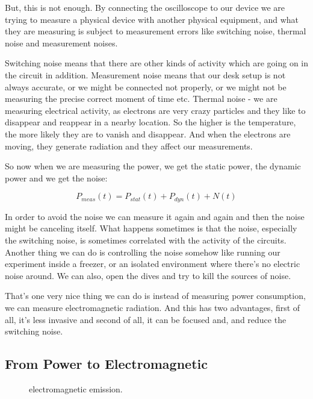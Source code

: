 But, this is not enough. By connecting the oscilloscope to our device we are
trying to measure a physical device with another physical equipment, and what
they are measuring is subject to measurement errors like switching noise,
thermal noise and measurement noises.

Switching noise means that there are other kinds of activity which are going on
in the circuit in addition. Measurement noise means that our desk setup is not
always accurate, or we might be connected not properly, or we might not be
measuring the precise correct moment of time etc. Thermal noise - we are
measuring electrical activity, as electrons are very crazy particles and they
like to disappear and reappear in a nearby location. So the higher is the
temperature, the more likely they are to vanish and disappear. And when the
electrons are moving, they generate radiation and they affect our measurements.

So now when we are measuring the power, we get the static power, the dynamic
power and we get the noise:

\begin{displaymath}
    P_{meas}(t)=P_{stat}(t) + P_{dyn}(t) + N(t)
\end{displaymath}

In order to avoid the noise we can measure it again and again and then the noise
might be canceling itself. What happens sometimes is that the noise, especially
the switching noise, is sometimes correlated with the activity of the circuits.
Another thing we can do is controlling the noise somehow like running our
experiment inside a freezer, or an isolated environment where there's no
electric noise around. We can also, open the dives and try to kill the sources
of noise.

That's one very nice thing we can do is instead of measuring power consumption,
we can measure electromagnetic radiation. And this has two advantages, first of
all, it's less invasive and second of all, it can be focused and, and reduce the
switching noise.

\subsection { From Power to Electromagnetic }

\begin{figure}[!ht]
    \centering
    
    \caption{electromagnetic emission.} \label{fig:electromagnetic emission}
\end{figure}

